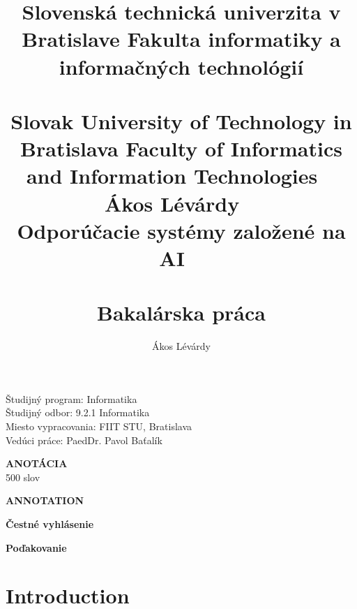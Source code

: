 \documentclass[10pt,oneside,english,a4paper]{article}
\title{\Large \textbf{ Slovenská technická univerzita v Bratislave Fakulta informatiky
a informačných technológií\\ \ \\Slovak University of Technology in Bratislava Faculty
of Informatics and Information Technologies} \ \\ \vspace{4\baselineskip} \Large{ Ákos
Lévárdy } \ \\ \LARGE{ Odporúčacie systémy založené na AI } \ \\ \ \\ \large{
Bakalárska práca } }
\author{Ákos Lévárdy}
\begin{document}
 \maketitle

\vspace{7\baselineskip} %
\hspace{-2cm} %
\parbox{0.8\textwidth}{ 
\raggedright %
\Large Študijný program:
Informatika\\ Študijný odbor: 9.2.1 Informatika\\ Miesto vypracovania: FIIT STU,
Bratislava\\ Vedúci práce: PaedDr. Pavol Baťalík \\}
\newpage{}
\hspace{-2cm} \Large \textbf{ANOTÁCIA}\\ 500 slov 

\newpage{} 
\hspace{-2cm} \Large \textbf{ANNOTATION}

\newpage{} 
\hspace{-2cm} \Large \textbf{Čestné vyhlásenie}

\newpage{} 
\hspace{-2cm} \Large \textbf{Poďakovanie} 

\newpage{} 
\tableofcontents

\newpage{} 
\section{Introduction}













\clearpage 
\normalsize 
 
 
\nocite{*}
\end{document}
